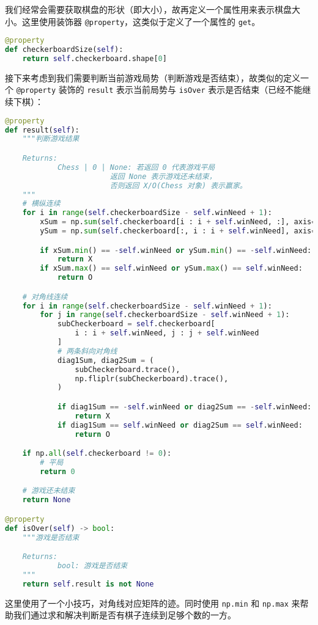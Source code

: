 我们经常会需要获取棋盘的形状（即大小），故再定义一个属性用来表示棋盘大小。这里使用装饰器 \verb`@property`，这类似于定义了一个属性的 \verb`get`。
\begin{lstlisting}[language=python]
@property
def checkerboardSize(self):
    return self.checkerboard.shape[0]
\end{lstlisting}

接下来考虑到我们需要判断当前游戏局势（判断游戏是否结束），故类似的定义一个 \verb`@property` 装饰的 \verb`result` 表示当前局势与 \verb`isOver` 表示是否结束（已经不能继续下棋）：
\begin{lstlisting}[language=python]
@property
def result(self):
    """判断游戏结果

    Returns:
            Chess | 0 | None: 若返回 0 代表游戏平局
                        返回 None 表示游戏还未结束，
                        否则返回 X/O(Chess 对象) 表示赢家。
    """
    # 横纵连续
    for i in range(self.checkerboardSize - self.winNeed + 1):
        xSum = np.sum(self.checkerboard[i : i + self.winNeed, :], axis=0)
        ySum = np.sum(self.checkerboard[:, i : i + self.winNeed], axis=1)

        if xSum.min() == -self.winNeed or ySum.min() == -self.winNeed:
            return X
        if xSum.max() == self.winNeed or ySum.max() == self.winNeed:
            return O

    # 对角线连续
    for i in range(self.checkerboardSize - self.winNeed + 1):
        for j in range(self.checkerboardSize - self.winNeed + 1):
            subCheckerboard = self.checkerboard[
                i : i + self.winNeed, j : j + self.winNeed
            ]
            # 两条斜向对角线
            diag1Sum, diag2Sum = (
                subCheckerboard.trace(),
                np.fliplr(subCheckerboard).trace(),
            )

            if diag1Sum == -self.winNeed or diag2Sum == -self.winNeed:
                return X
            if diag1Sum == self.winNeed or diag2Sum == self.winNeed:
                return O

    if np.all(self.checkerboard != 0):
        # 平局
        return 0

    # 游戏还未结束
    return None

@property
def isOver(self) -> bool:
    """游戏是否结束

    Returns:
            bool: 游戏是否结束
    """
    return self.result is not None
\end{lstlisting}
这里使用了一个小技巧，对角线对应矩阵的迹。同时使用 \verb`np.min` 和 \verb`np.max` 来帮助我们通过求和解决判断是否有棋子连续到足够个数的一方。

